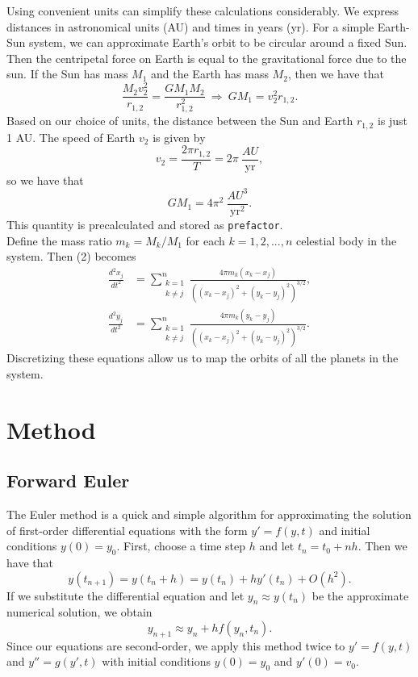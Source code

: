 \documentclass[prb,aps,twocolumn,showpacs,10pt]{revtex4-1}
\begin{document}
Using convenient units can simplify these calculations considerably. We express distances in astronomical units (AU) and times in years (yr). For a simple Earth-Sun system, we can approximate Earth's orbit to be circular around a fixed Sun. Then the centripetal force on Earth is equal to the gravitational force due to the sun. If the Sun has mass $M_1$ and the Earth has mass $M_2$, then we have that
\begin{equation}
\frac{M_2 v_2^2}{r_{1,2}}=\frac{GM_1M_2}{r_{1,2}^2} \  \Longrightarrow \ GM_1 = v_2^2r_{1,2}.
\end{equation}
Based on our choice of units, the distance between the Sun and Earth $r_{1,2}$ is just 1 AU. The speed of Earth $v_2$ is given by
\begin{equation}
v_2 = \frac{2\pi r_{1,2}}{T} = 2\pi \  \frac{AU}{\text{yr}},
\end{equation}
so we have that
\begin{equation}
GM_1 = 4\pi^2 \ \frac{AU^3}{\text{yr}^2}.
\end{equation}
This quantity is precalculated and stored as \texttt{prefactor}.\\

Define the mass ratio $m_k = M_k/M_1$ for each $k=1,2,...,n$ celestial body in the system. Then (2) becomes
\begin{equation}
\begin{split}
\frac{d^2x_j}{dt^2} &= \sum_{\substack{{k = 1}\\k \neq j}}^n \frac{4\pi m_k(x_k-x_j)}{((x_k-x_j)^2+(y_k-y_j)^2)^{3/2}},\\
\frac{d^2y_j}{dt^2} &= \sum_{\substack{{k = 1}\\k \neq j}}^n \frac{4\pi m_k(y_k-y_j)}{((x_k-x_j)^2+(y_k-y_j)^2)^{3/2}}.
\end{split}
\end{equation}
Discretizing these equations allow us to map the orbits of all the planets in the system. 

\section{Method}
\subsection{Forward Euler}
The Euler method is a quick and simple algorithm for approximating the solution of first-order differential equations with the form $y'=f(y,t)$ and initial conditions $y(0)=y_0$. First, choose a time step $h$ and let $t_n = t_0+nh$. Then we have that
\begin{equation}
y(t_{n+1})=y(t_n+h)=y(t_n)+hy'(t_n)+O(h^2).
\end{equation}
If we substitute the differential equation and let $y_n\approx y(t_n)$ be the approximate numerical solution, we obtain
\begin{equation}
y_{n+1}\approx y_n+hf(y_n,t_n).
\end{equation}
Since our equations are second-order, we apply this method twice to $y'=f(y,t)$ and $y''=g(y',t)$ with initial conditions $y(0)=y_0$ and $y'(0)=v_{0}$.
\end{document}
